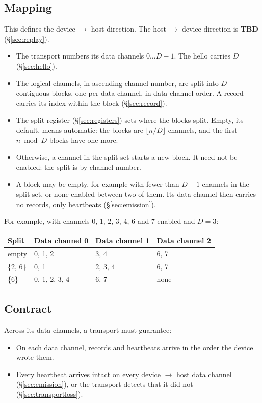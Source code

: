 \documentclass[11pt,a4paper]{article}
\newcommand{\tbd}{\textbf{TBD}}
\newcommand{\sref}[1]{\S\ref{#1}}
\begin{document}
\subsection{Mapping}\label{sec:mapping}

This defines the device $\to$ host direction. The host $\to$ device direction is
\tbd{} (\sref{sec:replay}).

\begin{itemize}
  \item The transport numbers its data channels $0 \ldots D-1$. The hello carries $D$
        (\sref{sec:hello}).
  \item The logical channels, in ascending channel number, are split into $D$
        contiguous blocks, one per data channel, in data channel order. A record
        carries its index within the block (\sref{sec:record}).
  \item The split register (\sref{sec:registers}) sets where the blocks split. Empty,
        its default, means automatic: the blocks are $\lfloor n/D \rfloor$ channels,
        and the first $n \bmod D$ blocks have one more.
  \item Otherwise, a channel in the split set starts a new block. It need not be
        enabled: the split is by channel number.
  \item A block may be empty, for example with fewer than $D-1$ channels in the split
        set, or none enabled between two of them. Its data channel then carries no
        records, only heartbeats (\sref{sec:emission}).
\end{itemize}

For example, with channels 0, 1, 2, 3, 4, 6 and 7 enabled and $D = 3$:

\begin{tabularx}{\linewidth}{@{}l l l L@{}}
\toprule
\textbf{Split} & \textbf{Data channel 0} & \textbf{Data channel 1} & \textbf{Data channel 2} \\
\midrule
empty & 0, 1, 2 & 3, 4 & 6, 7 \\
\{2, 6\} & 0, 1 & 2, 3, 4 & 6, 7 \\
\{6\} & 0, 1, 2, 3, 4 & 6, 7 & none \\
\bottomrule
\end{tabularx}

\subsection{Contract}\label{sec:contract}

Across its data channels, a transport must guarantee:
\begin{itemize}
  \item On each data channel, records and heartbeats arrive in the order the device
        wrote them.
  \item Every heartbeat arrives intact on every device $\to$ host data channel
        (\sref{sec:emission}), or the transport detects that it did not
        (\sref{sec:transportloss}).
\end{itemize}
\end{document}
